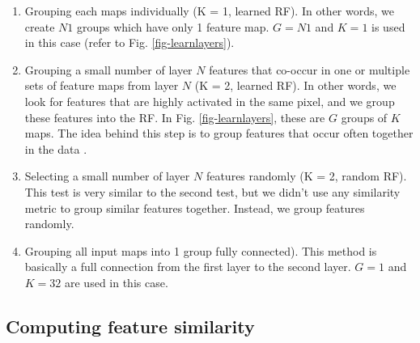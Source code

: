 \documentclass{article} %
\begin{document}
\begin{enumerate}

\item Grouping each maps individually (K = 1, learned RF). In other words, we create $N1$ groups which have only 1 feature map. 
$G = N1$ and $K = 1$ is used in this case (refer to Fig. \ref{fig-learnlayers}).

\item Grouping a small number of layer $N$ features that co-occur in one or multiple sets of feature maps from layer $N$ (K = 2, learned RF). 
In other words, we look for features that are highly activated in the same pixel, and we group these features into the RF.
In Fig. \ref{fig-learnlayers}, these are $G$ groups of $K$ maps.
The idea behind this step is to group features that occur often together in the data \cite{masquelier2007learning}.

\item Selecting a small number of layer $N$ features randomly (K = 2, random RF).
This test is very similar to the second test, but we didn't use any similarity metric to group similar features together.
Instead, we group features randomly.

\item Grouping all input maps into 1 group fully connected).
This method is basically a full connection from the first layer to the second layer. 
$G = 1$ and $K = 32$ are used in this case.

\end{enumerate}

\subsection{Computing feature similarity}
\end{document}
